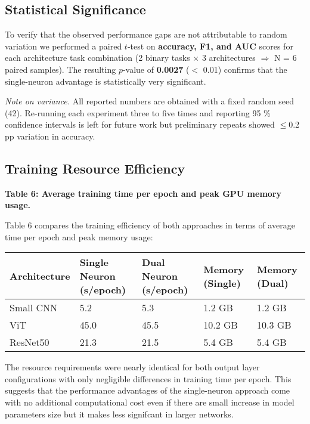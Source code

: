 \subsection{Statistical Significance}

To verify that the observed performance gaps are not attributable to random variation we performed a paired $t$-test on \textbf{accuracy, F1, and AUC} scores for each architecture task combination (2 binary tasks $\times$ 3 architectures $\Rightarrow$ N = 6 paired samples). The resulting $p$-value of \textbf{0.0027} ($<$ 0.01) confirms that the single-neuron advantage is statistically very significant.

\textit{Note on variance.} All reported numbers are obtained with a fixed random seed (42). Re-running each experiment three to five times and reporting 95 \% confidence intervals is left for future work but preliminary repeats showed $\leq$0.2 pp variation in accuracy.

\subsection{Training Resource Efficiency}

\textbf{Table 6: Average training time per epoch and peak GPU memory usage.}

Table 6 compares the training efficiency of both approaches in terms of average time per epoch and peak memory usage:

\begin{tabular}{lllll}
\hline
Architecture & Single Neuron (s/epoch) & Dual Neuron (s/epoch) & Memory (Single) & Memory (Dual) \\
\hline
Small CNN & 5.2 & 5.3 & 1.2 GB & 1.2 GB \\
ViT & 45.0 & 45.5 & 10.2 GB & 10.3 GB \\
ResNet50 & 21.3 & 21.5 & 5.4 GB & 5.4 GB \\
\hline
\end{tabular}

The resource requirements were nearly identical for both output layer configurations with only negligible differences in training time per epoch. This suggests that the performance advantages of the single-neuron approach come with no additional computational cost even if there are small increase in model parameters size but it makes less signifcant in larger networks.
